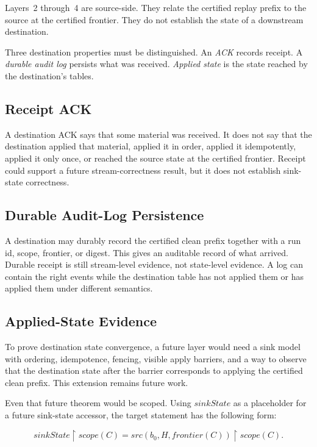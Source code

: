 \documentclass[letterpaper,10pt,twocolumn]{article}
\newcommand{\restrict}{\mathbin{\upharpoonright}}
\newcommand{\Src}{\mathit{src}}
\newcommand{\Scope}{\mathit{scope}}
\newcommand{\Frontier}{\mathit{frontier}}
\newcommand{\SinkState}{\mathit{sinkState}}
\begin{document}
Layers~2 through~4 are source-side. They relate the certified replay
prefix to the source at the certified frontier. They do not establish
the state of a downstream destination.

Three destination properties must be distinguished. An \emph{ACK}
records receipt. A \emph{durable audit log} persists what was received.
\emph{Applied state} is the state reached by the destination's tables.

\subsection{Receipt ACK}\label{receipt-ack}

A destination ACK says that some material was received. It does not say
that the destination applied that material, applied it in order, applied
it idempotently, applied it only once, or reached the source state at
the certified frontier. Receipt could support a future stream-correctness
result, but it does not establish sink-state correctness.

\subsection{Durable Audit-Log
Persistence}\label{durable-audit-log-persistence}

A destination may durably record the certified clean prefix together
with a run id, scope, frontier, or digest. This gives an auditable record
of what arrived. Durable receipt is still
stream-level evidence, not state-level evidence. A log can contain the
right events while the destination table has not applied them or has
applied them under different semantics.

\subsection{Applied-State Evidence}\label{applied-state-evidence}

To prove destination state convergence, a future layer would need a sink
model with ordering, idempotence, fencing, visible apply barriers, and a way
to observe that the destination state after the barrier corresponds to
applying the certified clean prefix. This extension remains future work.

Even that future theorem would be scoped. Using $\SinkState$ as a
placeholder for a future sink-state accessor, the target statement has
the following form:

\[
\SinkState \restrict \Scope(C)
  = \Src(b_0,H,\Frontier(C)) \restrict \Scope(C).
\]
\end{document}
